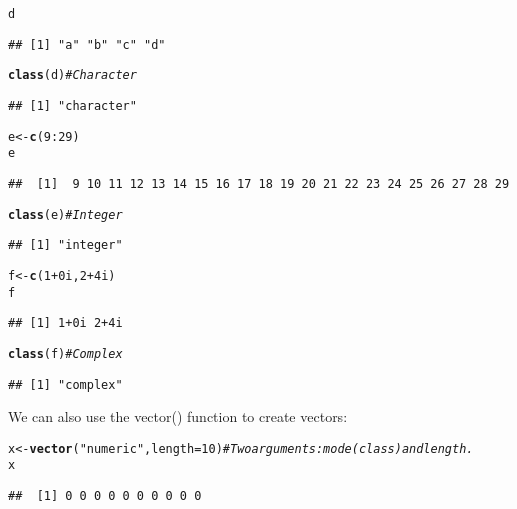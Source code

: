 \documentclass[10pt,a4paper,twoside]{article}\usepackage[]{graphicx}\usepackage[]{xcolor}
\makeatletter
\newcommand{\hlnum}[1]{\textcolor[rgb]{0.686,0.059,0.569}{#1}}%
\newcommand{\hlsng}[1]{\textcolor[rgb]{0.192,0.494,0.8}{#1}}%
\newcommand{\hlcom}[1]{\textcolor[rgb]{0.678,0.584,0.686}{\textit{#1}}}%
\newcommand{\hlopt}[1]{\textcolor[rgb]{0,0,0}{#1}}%
\newcommand{\hldef}[1]{\textcolor[rgb]{0.345,0.345,0.345}{#1}}%
\newcommand{\hlkwb}[1]{\textcolor[rgb]{0.69,0.353,0.396}{#1}}%
\newcommand{\hlkwc}[1]{\textcolor[rgb]{0.333,0.667,0.333}{#1}}%
\newcommand{\hlkwd}[1]{\textcolor[rgb]{0.737,0.353,0.396}{\textbf{#1}}}%
\newenvironment{kframe}{%
 \def\at@end@of@kframe{}%
 \ifinner\ifhmode%
  \def\at@end@of@kframe{\end{minipage}}%
  \begin{minipage}{\columnwidth}%
 \fi\fi%
 \def\FrameCommand##1{\hskip\@totalleftmargin \hskip-\fboxsep
 \colorbox{shadecolor}{##1}\hskip-\fboxsep
     \hskip-\linewidth \hskip-\@totalleftmargin \hskip\columnwidth}%
 \MakeFramed {\advance\hsize-\width
   \@totalleftmargin\z@ \linewidth\hsize
   \@setminipage}}%
 {\par\unskip\endMakeFramed%
 \at@end@of@kframe}
\newenvironment{knitrout}{}{} %
\makeatother
\begin{document}
\begin{knitrout}
\begin{kframe}
\begin{alltt}
\hldef{d}
\end{alltt}
\begin{verbatim}
## [1] "a" "b" "c" "d"
\end{verbatim}
\begin{alltt}
\hlkwd{class}\hldef{(d)} \hlcom{# Character}
\end{alltt}
\begin{verbatim}
## [1] "character"
\end{verbatim}
\begin{alltt}
\hldef{e} \hlkwb{<-} \hlkwd{c}\hldef{(}\hlnum{9}\hlopt{:}\hlnum{29}\hldef{)}
\hldef{e}
\end{alltt}
\begin{verbatim}
##  [1]  9 10 11 12 13 14 15 16 17 18 19 20 21 22 23 24 25 26 27 28 29
\end{verbatim}
\begin{alltt}
\hlkwd{class}\hldef{(e)} \hlcom{# Integer}
\end{alltt}
\begin{verbatim}
## [1] "integer"
\end{verbatim}
\begin{alltt}
\hldef{f} \hlkwb{<-} \hlkwd{c}\hldef{(}\hlnum{1} \hlopt{+} \hlnum{0i}\hldef{,} \hlnum{2} \hlopt{+} \hlnum{4i}\hldef{)}
\hldef{f}
\end{alltt}
\begin{verbatim}
## [1] 1+0i 2+4i
\end{verbatim}
\begin{alltt}
\hlkwd{class}\hldef{(f)} \hlcom{# Complex}
\end{alltt}
\begin{verbatim}
## [1] "complex"
\end{verbatim}
\end{kframe}
\end{knitrout}

We can also use the vector() function to create vectors:

\begin{knitrout}
\color{fgcolor}\begin{kframe}
\begin{alltt}
\hldef{x} \hlkwb{<-} \hlkwd{vector}\hldef{(}\hlsng{"numeric"}\hldef{,} \hlkwc{length} \hldef{=} \hlnum{10}\hldef{)} \hlcom{# Two arguments: mode (class) and length.}
\hldef{x}
\end{alltt}
\begin{verbatim}
##  [1] 0 0 0 0 0 0 0 0 0 0
\end{verbatim}
\end{kframe}
\end{knitrout}
\end{document}
